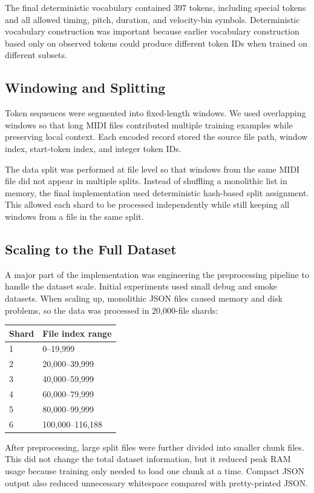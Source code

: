\documentclass{article}
\begin{document}
The final deterministic vocabulary contained 397 tokens, including special tokens and all allowed timing, pitch, duration, and velocity-bin symbols. Deterministic vocabulary construction was important because earlier vocabulary construction based only on observed tokens could produce different token IDs when trained on different subsets.

\subsection{Windowing and Splitting}
Token sequences were segmented into fixed-length windows. We used overlapping windows so that long MIDI files contributed multiple training examples while preserving local context. Each encoded record stored the source file path, window index, start-token index, and integer token IDs.

The data split was performed at file level so that windows from the same MIDI file did not appear in multiple splits. Instead of shuffling a monolithic list in memory, the final implementation used deterministic hash-based split assignment. This allowed each shard to be processed independently while still keeping all windows from a file in the same split.

\subsection{Scaling to the Full Dataset}
A major part of the implementation was engineering the preprocessing pipeline to handle the dataset scale. Initial experiments used small debug and smoke datasets. When scaling up, monolithic JSON files caused memory and disk problems, so the data was processed in 20,000-file shards:

\begin{center}
\begin{tabular}{ll}
\toprule
Shard & File index range \\
\midrule
1 & 0--19,999 \\
2 & 20,000--39,999 \\
3 & 40,000--59,999 \\
4 & 60,000--79,999 \\
5 & 80,000--99,999 \\
6 & 100,000--116,188 \\
\bottomrule
\end{tabular}
\end{center}

After preprocessing, large split files were further divided into smaller chunk files. This did not change the total dataset information, but it reduced peak RAM usage because training only needed to load one chunk at a time. Compact JSON output also reduced unnecessary whitespace compared with pretty-printed JSON.
\end{document}
